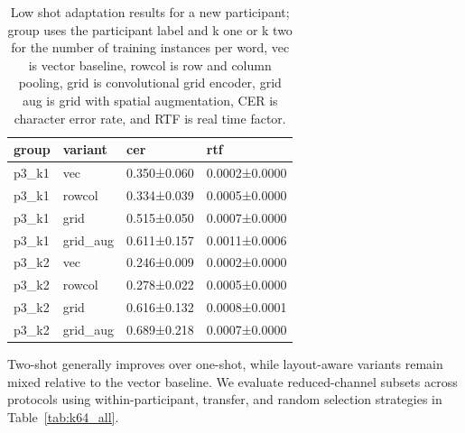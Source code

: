 \documentclass{Interspeech}
\begin{document}
\begin{table}[H]
    \centering
    \small
    \setlength{\tabcolsep}{4pt}
    \caption{Low shot adaptation results for a new participant; group uses the participant label and k one or k two for the number of training instances per word, vec is vector baseline, rowcol is row and column pooling, grid is convolutional grid encoder, grid aug is grid with spatial augmentation, CER is character error rate, and RTF is real time factor.}
    \label{tab:kshot}
    \begin{tabular*}{\columnwidth}{@{\extracolsep{\fill}}llll}
    \hline
    group & variant & cer & rtf \\
    \hline
    p3\_k1 & vec & 0.350±0.060 & 0.0002±0.0000 \\
    p3\_k1 & rowcol & 0.334±0.039 & 0.0005±0.0000 \\
    p3\_k1 & grid & 0.515±0.050 & 0.0007±0.0000 \\
    p3\_k1 & grid\_aug & 0.611±0.157 & 0.0011±0.0006 \\
    p3\_k2 & vec & 0.246±0.009 & 0.0002±0.0000 \\
    p3\_k2 & rowcol & 0.278±0.022 & 0.0005±0.0000 \\
    p3\_k2 & grid & 0.616±0.132 & 0.0008±0.0001 \\
    p3\_k2 & grid\_aug & 0.689±0.218 & 0.0007±0.0000 \\
    \hline
    \end{tabular*}
    \end{table}
Two-shot generally improves over one-shot, while layout-aware variants remain mixed relative to the vector baseline.
We evaluate reduced-channel subsets across protocols using within-participant, transfer, and random selection strategies in Table~\ref{tab:k64_all}.
\end{document}
